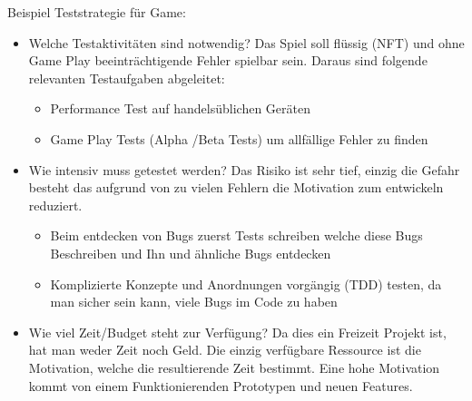 Beispiel Teststrategie für Game:
\begin{itemize}
    \item Welche Testaktivitäten sind notwendig? Das Spiel soll flüssig (NFT) und ohne Game Play beeinträchtigende Fehler spielbar sein. Daraus sind folgende relevanten Testaufgaben abgeleitet:
    \begin{itemize}
        \item Performance Test auf handelsüblichen Geräten
        \item Game Play Tests (Alpha /Beta Tests) um allfällige Fehler zu finden
    \end{itemize}
    \item Wie intensiv muss getestet werden? Das Risiko ist sehr tief, einzig die Gefahr besteht das aufgrund von zu vielen Fehlern die Motivation zum entwickeln reduziert.
    \begin{itemize}
        \item Beim entdecken von Bugs zuerst Tests schreiben welche diese Bugs Beschreiben und Ihn und ähnliche Bugs entdecken
        \item Komplizierte Konzepte und Anordnungen vorgängig (TDD) testen, da man sicher sein kann, viele Bugs im Code zu haben
    \end{itemize}
    \item Wie viel Zeit/Budget steht zur Verfügung? Da dies ein Freizeit Projekt ist, hat man weder Zeit noch Geld. Die einzig verfügbare Ressource ist die Motivation, welche die resultierende Zeit bestimmt. Eine hohe Motivation kommt von einem Funktionierenden Prototypen und neuen Features.
\end{itemize}